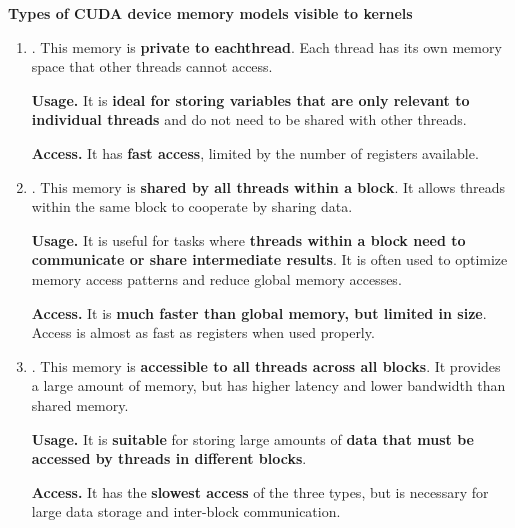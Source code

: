 \begin{flushleft}
    \label{CUDA memory: Types of CUDA device memory models visible to kernels}
    \textcolor{Green3}{ \textbf{Types of CUDA device memory models visible to kernels}}
\end{flushleft}
\begin{enumerate}
    \item {}. This memory is \textbf{private to each}\break \textbf{thread}. Each thread has its own memory space that other threads cannot access.
    
    \textcolor{Green3}{ \textbf{Usage.}} It is \textbf{ideal for storing variables that are only relevant to individual threads} and do not need to be shared with other threads.
    
    \textcolor{Green3}{ \textbf{Access.}} It has \textbf{fast access}, limited by the number of registers available.


    \item {}. This memory is \textbf{shared by all threads within a block}. It allows threads within the same block to cooperate by sharing data.
    
    \textcolor{Green3}{ \textbf{Usage.}} It is useful for tasks where \textbf{threads within a block need to communicate or share intermediate results}. It is often used to optimize memory access patterns and reduce global memory accesses.
    
    \textcolor{Green3}{ \textbf{Access.}} It is \textbf{much faster than global memory, but limited in size}. Access is almost as fast as registers when used properly.


    \item {}. This memory is \textbf{accessible to all threads across all blocks}. It provides a large amount of memory, but has higher latency and lower bandwidth than shared memory.
    
    \textcolor{Green3}{ \textbf{Usage.}} It is \textbf{suitable} for storing large amounts of \textbf{data that must be accessed by threads in different blocks}.
    
    \textcolor{Green3}{ \textbf{Access.}} It has the \textbf{slowest access} of the three types, but is necessary for large data storage and inter-block communication.
\end{enumerate}
